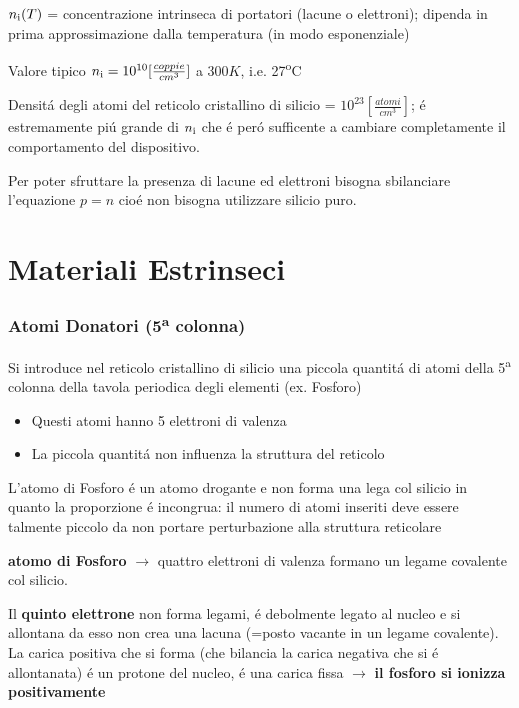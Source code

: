 $n\textsubscript{i}(T)$ = concentrazione intrinseca di portatori (lacune o elettroni); dipenda in prima approssimazione dalla temperatura (in modo esponenziale)

Valore tipico $n\textsubscript{i}=10^{10} [\frac{coppie}{cm^3}]$ a 300$K$, i.e. 27\textsuperscript{o}C

Densit\'a degli atomi del reticolo cristallino di silicio = $10^{23} [\frac{atomi}{cm^3}]$; \'e estremamente pi\'u grande di $n\textsubscript{i}$ che \'e per\'o sufficente a cambiare completamente il comportamento del dispositivo.

Per poter sfruttare la presenza di lacune ed elettroni bisogna sbilanciare l'equazione $p=n$ cio\'e non bisogna utilizzare silicio puro.

\section{Materiali Estrinseci}
\subsubsection{Atomi Donatori (5\textsuperscript{a} colonna)}

Si introduce nel reticolo cristallino di silicio una piccola quantit\'a di atomi della 5\textsuperscript{a} colonna della tavola periodica degli elementi (ex. Fosforo)

\begin{itemize}
    \item Questi atomi hanno 5 elettroni di valenza
    \item La piccola quantit\'a non influenza la struttura del reticolo
\end{itemize}

L'atomo di Fosforo \'e un atomo drogante e non forma una lega col silicio in quanto la proporzione \'e incongrua: il numero di atomi inseriti deve essere talmente piccolo da non portare perturbazione alla struttura reticolare

\textbf{atomo di Fosforo} $\rightarrow$ quattro elettroni di valenza formano un legame covalente col silicio.

Il \textbf{quinto elettrone} non forma legami, \'e debolmente legato al nucleo e si allontana da esso non crea una lacuna (=posto vacante in un legame covalente).
La carica positiva che si forma (che bilancia la carica negativa che si \'e allontanata) \'e un protone del nucleo, \'e una carica fissa $\rightarrow$ \textbf{il fosforo si ionizza positivamente}

